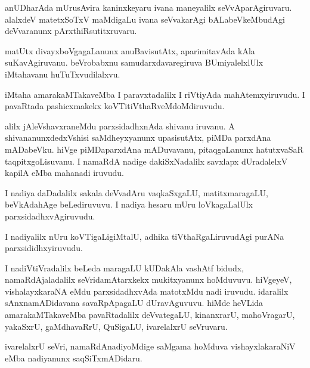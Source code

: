 \documentclass{article}
\begin{document}
\begin{mn}
anUDharAda mUrusAvira kaninxkeyaru ivana maneyalilx seVvAparAgiruvaru. alalxdeV matetxSoTxV
maMdigaLu ivana seVvakarAgi bALabeVkeMbudAgi deVvaranunx pArxthiRsutitxruvaru.
\end{mn}

\begin{mn}
matUtx divayxboVgagaLanunx anuBavisutAtx, aparimitavAda kAla suKavAgiruvanu. beVrobabxnu 
samudarxdavaregiruva BUmiyalelxlUlx iMtahavanu huTuTxvudilalxvu.
\end{mn}

\begin{mn}
iMtaha amarakaMTakaveMba I paravxtadalilx I riVtiyAda mahAtemxyiruvudu. I pavaRtada pashicxmakekx
koVTitiVthaRveMdoMdiruvudu.
\end{mn}

\begin{mn}
alilx jAleVshavxraneMdu parxsidadhxnAda shivanu iruvanu. A shivananunxdedxVshisi saMdheyxyanunx 
upasisutAtx, piMDa parxdAna mADabeVku. hiVge piMDaparxdAna mADuvavanu, pitaqgaLanunx hatutxvaSaR 
taqpitxgoLisuvanu. I namaRdA nadige dakiSxNadalilx savxlapx dUradalelxV kapilA eMba mahanadi 
iruvudu. 
\end{mn}

\begin{mn}
I nadiya daDadalilx  sakala deVvadAru vaqkaSxgaLU, matitxmaragaLU, beVkAdahAge beLediruvuvu.
I nadiya hesaru mUru loVkagaLalUlx parxsidadhxvAgiruvudu.
\end{mn}

\begin{mn}
I nadiyalilx nUru koVTigaLigiMtalU, adhika tiVthaRgaLiruvudAgi purANa parxsididhxyiruvudu.
\end{mn}

\begin{mn}
I nadiVtiVradalilx beLeda maragaLU kUDakAla vashAtf bidudx, namaRdAjaladalilx seVridamAtarxkekx 
mukitxyanunx hoMduvuvu. hiVgeyeV, vishalayxkaraNA eMdu parxsidadhxvAda matotxMdu nadi iruvudu. 
idaralilx sAnxnamADidavana savaRpApagaLU dUravAguvuvu. hiMde heVLida amarakaMTakaveMba pavaRtadalilx
deVvategaLU, kinanxrarU, mahoVragarU, yakaSxrU, gaMdhavaRrU, QuSigaLU, ivarelalxrU seVruvaru.
\end{mn}

\begin{mn}
ivarelalxrU seVri, namaRdAnadiyoMdige saMgama hoMduva vishayxlakaraNiV eMba nadiyanunx 
saqSiTxmADidaru.
\end{mn}
\end{document}
